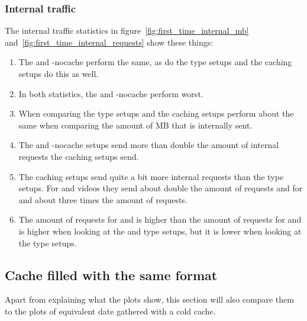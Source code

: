\documentclass[twoside,openright]{uva-bachelor-thesis}
\begin{document}

\FloatBarrier

\subsubsection{Internal traffic}
The internal traffic statistics in figure~\ref{fig:first_time_internal_mb}
and~\ref{fig:first_time_internal_requests} show these things:
\begin{enumerate}
    \item
        The \ipp and \lt-nocache perform the same, as do the \cdn type setups
        and the caching \lt setups do this as well.

    \item
        In both statistics, the \ipp and \lt-nocache perform worst.

    \item
        When comparing the \cdn type setups and the caching \lt setups perform
        about the same when comparing the amount of MB that is internally sent.

    \item
        The \ipp and \lt-nocache setups send more than double the amount of
        internal requests the caching \lt setups send.

    \item
        The caching \lt setups send quite a bit more internal requests than the
        \cdn type setups. For \dash and \iss videos they send about double the
        amount of requests and for \hds and \hls about three times the amount of
        requests.

    \item
        The amount of requests for \hds and \hls is higher than the amount of
        requests for \dash and \iss is higher when looking at the \ipp and \lt
        type setups, but it is lower when looking at the \cdn type setups.


\end{enumerate}




\FloatBarrier

\subsection{Cache filled with the same format}
Apart from explaining what the plots show, this section will also compare them
to the plots of equivalent date gathered with a cold cache.
\end{document}

